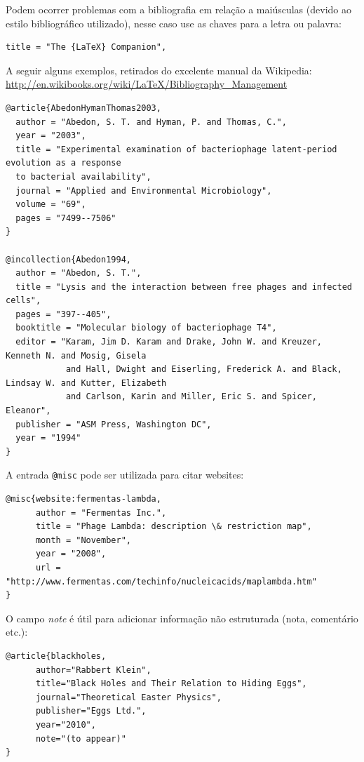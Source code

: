 Podem ocorrer problemas com a bibliografia em relação a maiúsculas (devido ao estilo bibliográfico utilizado), nesse caso use as chaves para a letra ou palavra:

\begin{verbatim}
title = "The {LaTeX} Companion",
\end{verbatim}

A seguir alguns exemplos, retirados do excelente manual da Wikipedia: \url{http://en.wikibooks.org/wiki/LaTeX/Bibliography_Management}

\begin{verbatim}
@article{AbedonHymanThomas2003,
  author = "Abedon, S. T. and Hyman, P. and Thomas, C.",
  year = "2003",
  title = "Experimental examination of bacteriophage latent-period evolution as a response 
  to bacterial availability",
  journal = "Applied and Environmental Microbiology",
  volume = "69",
  pages = "7499--7506"
}

@incollection{Abedon1994,
  author = "Abedon, S. T.",
  title = "Lysis and the interaction between free phages and infected cells",
  pages = "397--405",
  booktitle = "Molecular biology of bacteriophage T4",
  editor = "Karam, Jim D. Karam and Drake, John W. and Kreuzer, Kenneth N. and Mosig, Gisela
            and Hall, Dwight and Eiserling, Frederick A. and Black, Lindsay W. and Kutter, Elizabeth
            and Carlson, Karin and Miller, Eric S. and Spicer, Eleanor",
  publisher = "ASM Press, Washington DC",
  year = "1994"
}
\end{verbatim}

A entrada \verb+@misc+ pode ser utilizada para citar websites:

\begin{verbatim}
@misc{website:fermentas-lambda,
      author = "Fermentas Inc.",
      title = "Phage Lambda: description \& restriction map",
      month = "November",
      year = "2008",
      url = "http://www.fermentas.com/techinfo/nucleicacids/maplambda.htm"
}
\end{verbatim}

O campo \textit{note} é útil para adicionar informação não estruturada (nota, comentário etc.):

\begin{verbatim}
@article{blackholes,
      author="Rabbert Klein",
      title="Black Holes and Their Relation to Hiding Eggs",
      journal="Theoretical Easter Physics",
      publisher="Eggs Ltd.",
      year="2010",
      note="(to appear)"
}
\end{verbatim}

